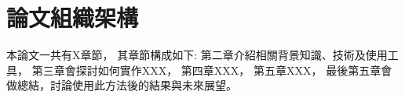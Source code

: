 \section{論文組織架構}
\indent
本論文一共有X章節，
其章節構成如下:
第二章介紹相關背景知識、技術及使用工具，
第三章會探討如何實作XXX，
第四章XXX，
第五章XXX，
最後第五章會做總結，討論使用此方法後的結果與未來展望。

